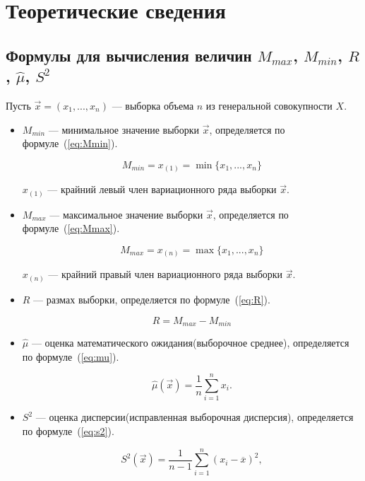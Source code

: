 \chapter{Теоретические сведения}

\section{Формулы для вычисления величин $M_{max}$,  $M_{min}$, $R$, $\hat{\mu}$, $S^2$}

Пусть $\vec{x} = (x_1, ..., x_n)$ --- выборка объема $n$ из генеральной совокупности $X$.

\begin{itemize}
	\item $M_{min}$ --- минимальное значение выборки $\vec{x}$, определяется по формуле~(\ref{eq:Mmin}).
	
	\begin{equation}
		\label{eq:Mmin}
		M_{min} = x_{(1)} = \min\{x_1, ..., x_n\}
	\end{equation}
	
	 $x_{(1)}$ --- крайний левый член вариационного ряда выборки $\vec{x}$.
	
	\item $M_{max}$ --- максимальное значение выборки $\vec{x}$, определяется по формуле~(\ref{eq:Mmax}).
	
	\begin{equation}
		\label{eq:Mmax}
		M_{max} = x_{(n)} = \max\{x_1, ..., x_n\}
	\end{equation}
	
	 $x_{(n)}$ --- крайний правый член вариационного ряда выборки $\vec{x}$.
	
	\item $R$ --- размах выборки, определяется по формуле~(\ref{eq:R}).
	
	\begin{equation}
		\label{eq:R}
		R = M_{max} - M_{min}
	\end{equation}
	
	\item $\hat{\mu}$ --- оценка математического ожидания(выборочное среднее), определяется по формуле~(\ref{eq:mu}).
	
	\begin{equation}
		\label{eq:mu}
		\hat{\mu}(\vec{x}) = \frac{1}{n}\sum_{i=1}^{n} x_i.
	\end{equation}
	
	
	\item $S^2$ --- оценка дисперсии(исправленная выборочная дисперсия), определяется по формуле~(\ref{eq:s2}).
	
	\begin{equation}
		\label{eq:s2}
		S^2(\vec x) = \frac 1{n-1} \sum_{i=1}^n (x_i-\overline x)^2,
	\end{equation}
\end{itemize}

